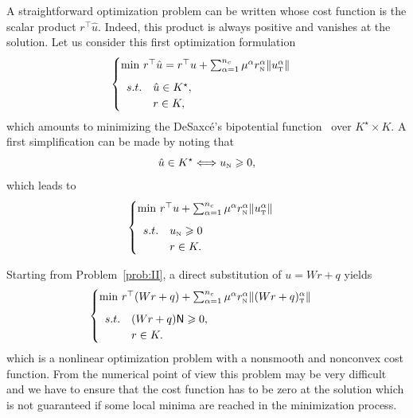 { A straightforward optimization problem can be written whose cost function is the scalar product $r^\top\hat u$. Indeed, this product is always  positive and vanishes at the solution. Let us consider this first optimization formulation
\begin{equation}
  \label{eq:opt-1}
  \begin{cases}
    \min\,  r^\top \hat u = r^\top u + \sum _{\alpha=1}^{n_c} \mu^\alpha r_\n^\alpha \|u_\t^\alpha\| \\[2mm]
    \begin{array}{ll}
    s.t. &\hat u \in K^\star, \\
    &r \in K,
  \end{array}
  \end{cases}
\end{equation}
which amounts to minimizing the DeSaxc\'e's bipotential function~\cite{DeSaxce92} over $K^\star\times K$. A first simplification can be made by noting that
\begin{equation}
  \label{eq:equiv-cone}
  \hat u \in K^\star \Longleftrightarrow u_{\n} \geq 0, 
\end{equation}
which leads to
\begin{equation}
  \label{eq:opt-2}
  \begin{cases}
    \min\, r^\top u + \sum _{\alpha=1}^{n_c} \mu^\alpha r_\n^\alpha \|u_\t^\alpha\| \\[2mm]
     \begin{array}{ll}
    s.t. &u_\n \geq 0\\
    &r \in K.
  \end{array}
  \end{cases}
\end{equation}


Starting from Problem~\ref{prob:II}, a direct substitution of $u = Wr +q$ yields
\begin{equation}
  \label{eq:opt-3}
  \begin{cases}
    \min\, r^\top (Wr+q) + \sum _{\alpha=1}^{n_c} \mu^\alpha r_\n^\alpha \|(Wr+q)_\t^\alpha\| \\[2mm]
    \begin{array}{ll}
      s.t. &(W r + q){\sf N} \geq 0, \\
      &r \in K.
    \end{array}
  \end{cases}
\end{equation}
which is a nonlinear optimization problem with a nonsmooth and nonconvex cost function.  From the numerical point of view this problem may be very difficult and we have to ensure that the cost function has to be zero at the solution which is not guaranteed if some local minima are reached in the minimization process.

}
